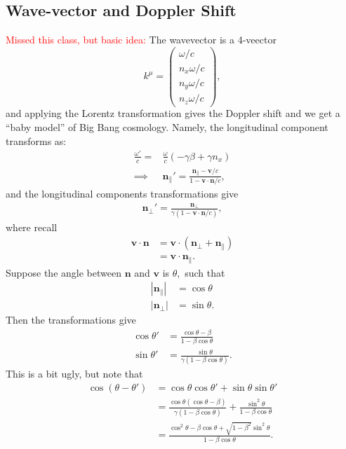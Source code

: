\documentclass{article}
\numberwithin{equation}{section}
\begin{document}
\subsection{Wave-vector and Doppler Shift}
\textcolor{red}{Missed this class, but basic idea:} The wavevector is a 4-veector 
\begin{equation}
    k^\mu = \begin{pmatrix}
        \omega/c \\ 
        n_x \omega/c \\ 
        n_y \omega/c \\
        n_z \omega/c
    \end{pmatrix},
\end{equation}
and applying the Lorentz transformation gives the Doppler shift and we get a ``baby model'' of Big Bang cosmology. Namely, the longitudinal component transforms as:
\begin{align}
    \frac{\omega'}{c} =& \frac{\omega}{c}(-\gamma \beta + \gamma n_x) \\
    \implies & \bm{n}_{\parallel}' = \frac{\bm{n}_{\parallel}-\bm{v}/c}{1- \bm{v}\cdot \bm{n} / c},
\end{align}
and the longitudinal components transformations give
\begin{align}
    \bm{n}_{\perp}' = \frac{\bm{n}_\perp}{\gamma(1-\bm{v}\cdot \bm{n}/c)},
\end{align}
where recall 
\begin{align}
    \bm{v} \cdot \bm{n} &= \bm{v} \cdot (\bm{n}_\perp + \bm{n}_\parallel) \\ 
    &= \bm{v}\cdot \bm{n}_{\parallel}.
\end{align}
Suppose the angle between $\bm{n}$ and $\bm{v}$ is $\theta,$ such that 
\begin{align}
    |\bm{n}_{\parallel}| &= \cos\theta \\ 
    |\bm{n}_{\perp}| &= \sin\theta.
\end{align}
Then the transformations give 
\begin{align}
    \cos\theta' &= \frac{\cos\theta - \beta}{1-\beta\cos\theta} \\ 
    \sin\theta' &= \frac{\sin\theta}{\gamma(1-\beta\cos\theta)}.
\end{align}
This is a bit ugly, but note that 
\begin{align}
    \cos(\theta-\theta') &= \cos\theta\cos\theta' + \sin\theta\sin\theta' \\ 
    &= \frac{\cos\theta(\cos\theta-\beta)}{\gamma(1-\beta\cos\theta)} + \frac{\sin^2\theta}{1-\beta\cos\theta} \\ 
    &= \frac{\cos^2\theta - \beta\cos\theta + \sqrt{1-\beta^2}\sin^2\theta}{1-\beta\cos\theta}.
\end{align}
\end{document}
